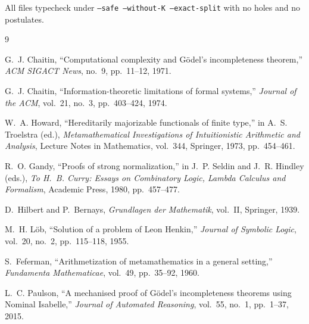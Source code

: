 \documentclass[11pt]{article}
\begin{document}
All files typecheck under \texttt{--safe --without-K --exact-split}
with no holes and no postulates.

\begin{thebibliography}{9}

G.~J. Chaitin, ``Computational complexity and G\"odel's incompleteness theorem,''
\emph{ACM SIGACT News}, no.~9, pp.~11--12, 1971.

G.~J. Chaitin, ``Information-theoretic limitations of formal systems,''
\emph{Journal of the ACM}, vol.~21, no.~3, pp.~403--424, 1974.

W.~A. Howard, ``Hereditarily majorizable functionals of finite type,''
in A.~S. Troelstra (ed.), \emph{Metamathematical Investigations of
Intuitionistic Arithmetic and Analysis}, Lecture Notes in Mathematics,
vol.~344, Springer, 1973, pp.~454--461.

R.~O. Gandy, ``Proofs of strong normalization,'' in J.~P. Seldin and
J.~R. Hindley (eds.), \emph{To H.~B. Curry: Essays on Combinatory Logic,
Lambda Calculus and Formalism}, Academic Press, 1980, pp.~457--477.

D.~Hilbert and P.~Bernays, \emph{Grundlagen der Mathematik}, vol.~II,
Springer, 1939.

M.~H. L\"ob, ``Solution of a problem of Leon Henkin,''
\emph{Journal of Symbolic Logic}, vol.~20, no.~2, pp.~115--118, 1955.

S.~Feferman, ``Arithmetization of metamathematics in a general setting,''
\emph{Fundamenta Mathematicae}, vol.~49, pp.~35--92, 1960.

L.~C. Paulson, ``A mechanised proof of G\"odel's incompleteness theorems
using Nominal Isabelle,'' \emph{Journal of Automated Reasoning},
vol.~55, no.~1, pp.~1--37, 2015.

\end{thebibliography}
\end{document}
